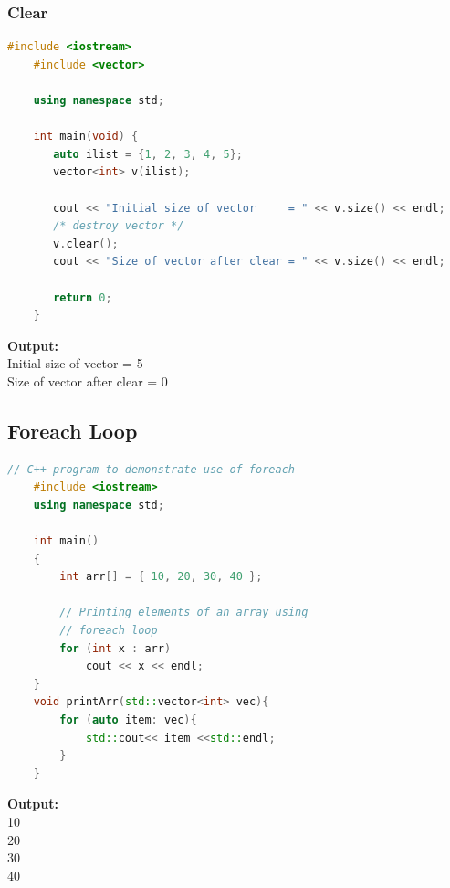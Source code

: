 \documentclass[12pt , a4paper]{article}
\begin{document}
	\subsubsection{Clear}
	\begin{lstlisting}[language=C++]
	#include <iostream>
	#include <vector>
	
	using namespace std;
	
	int main(void) {
	   auto ilist = {1, 2, 3, 4, 5};
	   vector<int> v(ilist);
	
	   cout << "Initial size of vector     = " << v.size() << endl;
	   /* destroy vector */
	   v.clear();
	   cout << "Size of vector after clear = " << v.size() << endl;
	
	   return 0;
	}
	\end{lstlisting}

	\begin{tcolorbox}
	\textbf{Output:}\\
	Initial size of vector     = 5\\
	Size of vector after clear = 0
	\end{tcolorbox}


	\subsection{Foreach Loop}
	\begin{lstlisting}[language=C++]
	// C++ program to demonstrate use of foreach
	#include <iostream>
	using namespace std;
	
	int main()
	{
		int arr[] = { 10, 20, 30, 40 };
	
		// Printing elements of an array using
		// foreach loop
		for (int x : arr)
			cout << x << endl;
	}
	void printArr(std::vector<int> vec){
	    for (auto item: vec){
	        std::cout<< item <<std::endl;
	    }
	}

	\end{lstlisting}

	\begin{tcolorbox}
	\textbf{Output:}\\
	10\\
	20\\
	30\\
	40
	\end{tcolorbox}
\end{document}
